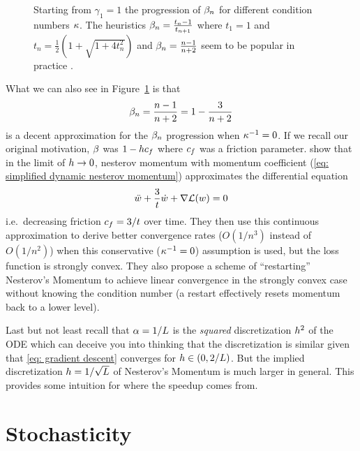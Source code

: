 \begin{figure}[h]
	\centering
	\def\svgwidth{1\textwidth}
	
	\caption{
		Starting from \(\gamma_1=1\) the progression of \(\beta_n\) for
		different condition numbers \(\kappa\). The heuristics
		\(\beta_n=\frac{t_n-1}{t_{n+1}}\) where \(t_1=1\) and
		\(t_n=\tfrac12(1+\sqrt{1+4t_n^2})\) and \(\beta_n=\frac{n-1}{n+2}\)
		seem to be popular in practice \parencite{rechtOptimization2013}.
	}
	\label{fig: momentum progression}
\end{figure}

What we can also see in Figure~\ref{fig: momentum progression} is that
\begin{align}\label{eq: simplified dynamic nesterov momentum}
	\beta_n = \frac{n-1}{n+2} = 1-\frac{3}{n+2}
\end{align}
is a decent approximation for the \(\beta_n\) progression when \(\kappa^{-1}=0\).
If we recall our original motivation, \(\beta\) was \(1-hc_f\) where
\(c_f\) was a friction parameter. \textcite{suDifferentialEquationModeling2015}
show that in the limit of \(h\to0\), nesterov momentum with momentum
coefficient (\ref{eq: simplified dynamic nesterov momentum}) approximates the
differential equation
\begin{align*}
	\ddot{w} + \frac{3}{t}\dot{w} + \nabla\mathcal{L}(w) = 0
\end{align*}
i.e.\ decreasing friction \(c_f=3/t\) over time. They then use this
continuous approximation to derive better convergence rates (\(O(1/n^3)\) instead of
\(O(1/n^2)\)) when this conservative (\(\kappa^{-1}=0\)) assumption is used,
but the loss function is strongly convex. They also propose a scheme of
``restarting'' Nesterov's Momentum to achieve linear convergence in the
strongly convex case without knowing the condition number (a restart effectively
resets momentum back to a lower level).

Last but not least recall that \(\alpha=1/L\) is the \emph{squared}
discretization \(h^2\) of the ODE which can deceive you into thinking that the
discretization is similar given that \ref{eq: gradient descent} converges for \(h \in
(0,2/L)\). But the implied discretization \(h=1/\sqrt{L}\) of
Nesterov's Momentum is much larger in general. This provides some intuition
for where the speedup comes from.


\section{Stochasticity}

